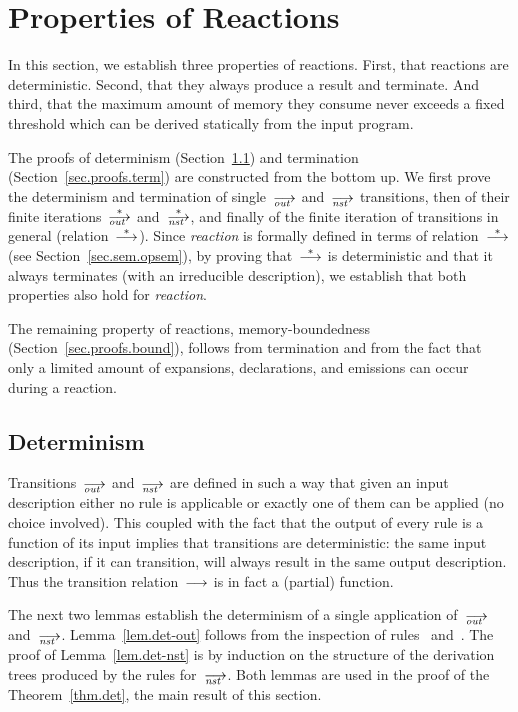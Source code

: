\section{Properties of \CEU Reactions}
\label{sec.proofs}

In this section, we establish three properties of \CEU reactions.  First,
that reactions are deterministic.  Second, that they always produce a result
and terminate. And third, that the maximum amount of memory they consume
never exceeds a fixed threshold which can be derived statically from the
input program.

The proofs of determinism (Section~\ref{sec.proofs.det}) and termination
(Section~\ref{sec.proofs.term}) are constructed from the bottom up.  We
first prove the determinism and termination of single~$\out$ and~$\nst$
transitions, then of their finite iterations~$\out[*]$ and~$\nst[*]$, and
finally of the finite iteration of transitions in general
(relation~$\trans[*]$).  Since \emph{reaction} is formally defined in terms
of relation~$\trans[*]$ (see Section~\ref{sec.sem.opsem}), by proving
that~$\trans[*]$ is deterministic and that it always terminates (with an
irreducible description), we establish that both properties also hold for
\emph{reaction}.

The remaining property of reactions, memory-boundedness
(Section~\ref{sec.proofs.bound}), follows from termination and from the fact
that only a limited amount of expansions, declarations, and emissions can
occur during a reaction.

\subsection{Determinism}
\label{sec.proofs.det}

Transitions~$\out$ and~$\nst$ are defined in such a way that given an input
description either no rule is applicable or exactly one of them can be
applied (no choice involved).  This coupled with the fact that the output of
every rule is a function of its input implies that transitions are
deterministic: the same input description, if it can transition, will always
result in the same output description.  Thus the transition
relation~$\trans$ is in fact a (partial) function.

The next two lemmas establish the determinism of a single application
of~$\out$ and~$\nst$.  Lemma~\ref{lem.det-out} follows from the
inspection of rules~ and~.  The proof of
Lemma~\ref{lem.det-nst} is by induction on the structure of the derivation
trees produced by the rules for~$\nst$.  Both lemmas are used in the proof
of the Theorem~\ref{thm.det}, the main result of this section.


